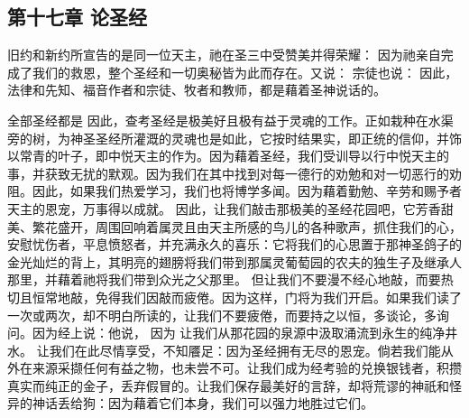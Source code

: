 \subsection{第十七章 论圣经}

旧约和新约所宣告的是同一位天主，祂在圣三中受赞美并得荣耀： 因为祂亲自完成了我们的救恩，整个圣经和一切奥秘皆为此而存在。又说： 宗徒也说： 因此，法律和先知、福音作者和宗徒、牧者和教师，都是藉着圣神说话的。\par

全部圣经都是 因此，查考圣经是极美好且极有益于灵魂的工作。正如栽种在水渠旁的树，为神圣圣经所灌溉的灵魂也是如此，它按时结果实，即正统的信仰，并饰以常青的叶子，即中悦天主的作为。因为藉着圣经，我们受训导以行中悦天主的事，并获致无扰的默观。因为我们在其中找到对每一德行的劝勉和对一切恶行的劝阻。因此，如果我们热爱学习，我们也将博学多闻。因为藉着勤勉、辛劳和赐予者天主的恩宠，万事得以成就。 因此，让我们敲击那极美的圣经花园吧，它芳香甜美、繁花盛开，周围回响着属灵且由天主所感的鸟儿的各种歌声，抓住我们的心，安慰忧伤者，平息愤怒者，并充满永久的喜乐：它将我们的心思置于那神圣鸽子的金光灿烂的背上，其明亮的翅膀将我们带到那属灵葡萄园的农夫的独生子及继承人那里，并藉着祂将我们带到众光之父那里。 但让我们不要漫不经心地敲，而要热切且恒常地敲，免得我们因敲而疲倦。因为这样，门将为我们开启。如果我们读了一次或两次，却不明白所读的，让我们不要疲倦，而要持之以恒，多谈论，多询问。因为经上说：他说， 因为 让我们从那花园的泉源中汲取涌流到永生的纯净井水。 让我们在此尽情享受，不知餍足：因为圣经拥有无尽的恩宠。倘若我们能从外在来源采撷任何有益之物，也未尝不可。让我们成为经考验的兑换银钱者，积攒真实而纯正的金子，丢弃假冒的。让我们保存最美好的言辞，却将荒谬的神祇和怪异的神话丢给狗：因为藉着它们本身，我们可以强力地胜过它们。\par

